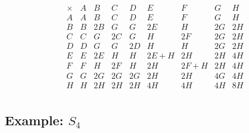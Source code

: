 \documentclass[11pt,oneside]{article}
\newcommand{\thinplus}{\!+\!}
\begin{document}
$$
\begin{array}{r|rrrrrrrr}
\times & A & B & C & D & E & F & G & H \\
\hline
A & A & B & C & D & E & F & G & H \\
B & B & 2B & G & G & 2E & H & 2G & 2H \\
C & C & G & 2C & G & H & 2F & 2G & 2H \\
D & D & G & G & 2D & H & H & 2G & 2H \\
E & E & 2E & H & H & 2E\thinplus H & 2H & 2H & 4H \\
F & F & H & 2F & H & 2H & 2F\thinplus H & 2H & 4H \\
G & G & 2G & 2G & 2G & 2H & 2H & 4G & 4H \\
H & H & 2H & 2H & 2H & 4H & 4H & 4H & 8H \\
\end{array}
$$


\subsection{Example: $S_4$}

\end{document}
